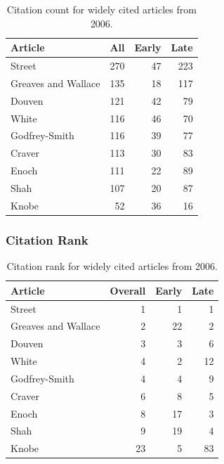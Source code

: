 \documentclass[
  10pt,
  letterpaper,
  DIV=11,
  numbers=noendperiod,
  twoside]{scrartcl}
\begin{document}
\begin{longtable}[]{@{}lrrr@{}}

\caption{\label{tbl-citation-count-2006}Citation count for widely cited
articles from 2006.}

\tabularnewline

\toprule\noalign{}
Article & All & Early & Late \\
\midrule\noalign{}
\endhead
\bottomrule\noalign{}
\endlastfoot
Street & 270 & 47 & 223 \\
Greaves and Wallace & 135 & 18 & 117 \\
Douven & 121 & 42 & 79 \\
White & 116 & 46 & 70 \\
Godfrey-Smith & 116 & 39 & 77 \\
Craver & 113 & 30 & 83 \\
Enoch & 111 & 22 & 89 \\
Shah & 107 & 20 & 87 \\
Knobe & 52 & 36 & 16 \\

\end{longtable}

\subsubsection*{Citation Rank}\label{sec-rank-2006}

\begin{longtable}[]{@{}lrrr@{}}

\caption{\label{tbl-citation-rank-2006}Citation rank for widely cited
articles from 2006.}

\tabularnewline

\toprule\noalign{}
Article & Overall & Early & Late \\
\midrule\noalign{}
\endhead
\bottomrule\noalign{}
\endlastfoot
Street & 1 & 1 & 1 \\
Greaves and Wallace & 2 & 22 & 2 \\
Douven & 3 & 3 & 6 \\
White & 4 & 2 & 12 \\
Godfrey-Smith & 4 & 4 & 9 \\
Craver & 6 & 8 & 5 \\
Enoch & 8 & 17 & 3 \\
Shah & 9 & 19 & 4 \\
Knobe & 23 & 5 & 83 \\

\end{longtable}
\end{document}
